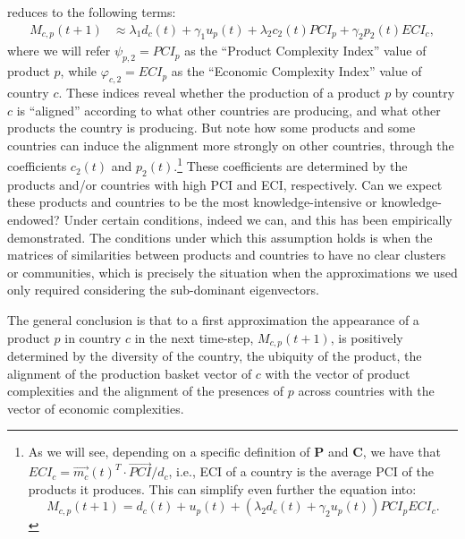 \documentclass[12pt]{article}
\newcommand{\mtx}[1]{\mathbf{ #1}}
\begin{document}
 reduces to the following terms:
\begin{align*}
	M_{c,p}(t+1) &\approx \lambda_1 d_c(t) + \gamma_1 u_p(t) + \lambda_2 c_2(t) PCI_{p} + \gamma_2 p_2(t) ECI_{c},
\end{align*}
where we will refer $\psi_{p,2} = PCI_p$ as the ``Product Complexity Index'' value of product $p$, while $\varphi_{c,2} = ECI_p$ as the ``Economic Complexity Index'' value of country $c$. These indices reveal whether the production of a product $p$ by country $c$ is ``aligned'' according to what other countries are producing, and what other products the country is producing. But note how some products and some countries can induce the alignment more strongly on other countries, through the coefficients $c_2(t)$ and $p_2(t)$.\footnote{As we will see, depending on a specific definition of $\mtx{P}$ and $\mtx{C}$, we have that $ECI_c = \vec{m_c}(t)^T\cdot\vec{PCI}/d_c$, i.e., ECI of a country is the average PCI of the products it produces. This can simplify even further the equation into: $$M_{c,p}(t+1) = d_c(t) + u_p(t) + (\lambda_2 d_c(t)  + \gamma_2 u_p(t) )PCI_{p}ECI_{c}.$$} These coefficients are determined by the products and/or countries with high PCI and ECI, respectively. Can we expect these products and countries to be the most knowledge-intensive or knowledge-endowed? Under certain conditions, indeed we can, and this has been empirically demonstrated. The conditions under which this assumption holds is when the matrices of similarities between products and countries to have no clear clusters or communities, which is precisely the situation when the approximations we used only required considering the sub-dominant eigenvectors.

The general conclusion is that to a first approximation the appearance of a product $p$ in country $c$ in the next time-step, $M_{c,p}(t+1)$, is positively determined by the diversity of the country, the ubiquity of the product, the alignment of the production basket vector of $c$ with the vector of product complexities and the alignment of the presences of $p$ across countries with the vector of economic complexities. 


\end{document}
